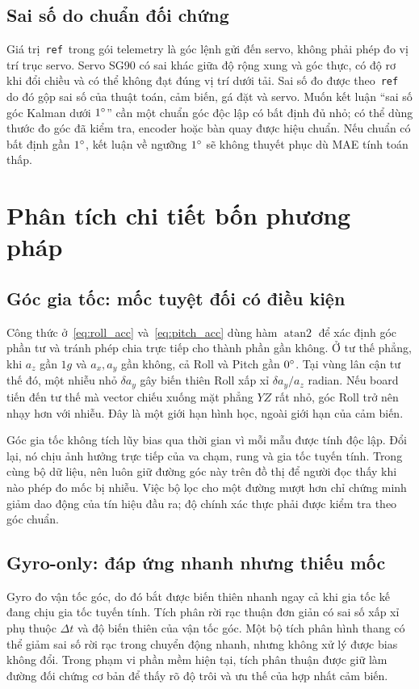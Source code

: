 \subsection{Sai số do chuẩn đối chứng}
Giá trị \,\texttt{ref}\, trong gói telemetry là góc lệnh gửi đến servo, không phải phép đo vị trí trục servo. Servo SG90 có sai khác giữa độ rộng xung và góc thực, có độ rơ khi đổi chiều và có thể không đạt đúng vị trí dưới tải. Sai số đo được theo \,\texttt{ref}\, do đó gộp sai số của thuật toán, cảm biến, gá đặt và servo. Muốn kết luận ``sai số góc Kalman dưới $1^{\circ}$'' cần một chuẩn góc độc lập có bất định đủ nhỏ; có thể dùng thước đo góc đã kiểm tra, encoder hoặc bàn quay được hiệu chuẩn. Nếu chuẩn có bất định gần $1^{\circ}$, kết luận về ngưỡng $1^{\circ}$ sẽ không thuyết phục dù MAE tính toán thấp.

\section{Phân tích chi tiết bốn phương pháp}
\subsection{Góc gia tốc: mốc tuyệt đối có điều kiện}
Công thức ở~\eqref{eq:roll_acc} và~\eqref{eq:pitch_acc} dùng hàm $\operatorname{atan2}$ để xác định góc phần tư và tránh phép chia trực tiếp cho thành phần gần không. Ở tư thế phẳng, khi $a_z$ gần $1g$ và $a_x,a_y$ gần không, cả Roll và Pitch gần $0^{\circ}$. Tại vùng lân cận tư thế đó, một nhiễu nhỏ $\delta a_y$ gây biến thiên Roll xấp xỉ $\delta a_y/a_z$ radian. Nếu board tiến đến tư thế mà vector chiếu xuống mặt phẳng $YZ$ rất nhỏ, góc Roll trở nên nhạy hơn với nhiễu. Đây là một giới hạn hình học, ngoài giới hạn của cảm biến.

Góc gia tốc không tích lũy bias qua thời gian vì mỗi mẫu được tính độc lập. Đổi lại, nó chịu ảnh hưởng trực tiếp của va chạm, rung và gia tốc tuyến tính. Trong cùng bộ dữ liệu, nên luôn giữ đường góc này trên đồ thị để người đọc thấy khi nào phép đo mốc bị nhiễu. Việc bộ lọc cho một đường mượt hơn chỉ chứng minh giảm dao động của tín hiệu đầu ra; độ chính xác thực phải được kiểm tra theo góc chuẩn.

\subsection{Gyro-only: đáp ứng nhanh nhưng thiếu mốc}
Gyro đo vận tốc góc, do đó bắt được biến thiên nhanh ngay cả khi gia tốc kế đang chịu gia tốc tuyến tính. Tích phân rời rạc thuận đơn giản có sai số xấp xỉ phụ thuộc $\Delta t$ và độ biến thiên của vận tốc góc. Một bộ tích phân hình thang có thể giảm sai số rời rạc trong chuyển động nhanh, nhưng không xử lý được bias không đổi. Trong phạm vi phần mềm hiện tại, tích phân thuận được giữ làm đường đối chứng cơ bản để thấy rõ độ trôi và ưu thế của hợp nhất cảm biến.

